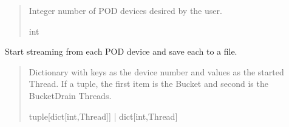 \documentclass[letterpaper,10pt,english]{sphinxmanual}
\begin{document}
\begin{fulllineitems}
\begin{fulllineitems}
\begin{quote}
\begin{description}
\sphinxAtStartPar
Integer number of POD devices desired by the user.

\sphinxAtStartPar
int

\end{description}\end{quote}

\end{fulllineitems}


\begin{fulllineitems}
\label{\detokenize{Setup.SetupOneDevice:Setup.SetupOneDevice.Setup_PodInterface.SetupInterface._StreamThreading}}
\pysigstartsignatures
{}
\pysigstopsignatures
\sphinxAtStartPar
Start streaming from each POD device and save each to a file.
\begin{quote}\begin{description}
\sphinxAtStartPar
Dictionary with keys as the device number and                 values as the started Thread. If a tuple, the first item is the Bucket and second is the                 BucketDrain Threads.

\sphinxAtStartPar
tuple{[}dict{[}int,Thread{]}{]} | dict{[}int,Thread{]}

\end{description}\end{quote}

\end{fulllineitems}



\end{fulllineitems}
\end{document}
